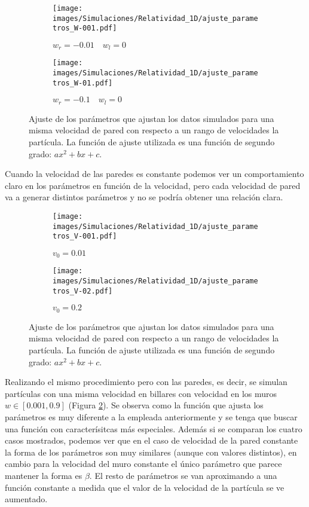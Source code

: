 \begin{figure}[H]
    \begin{subfigure}[b]{0.5\textwidth}
        \centering
        \texttt{[image: images/Simulaciones/Relatividad\_1D/ajuste\_parametros\_W-001.pdf]}
        \caption{$w_r = -0.01 \quad w_l = 0$}
    \end{subfigure}
    \hfill
    \begin{subfigure}[b]{0.5\textwidth}
        \centering
        \texttt{[image: images/Simulaciones/Relatividad\_1D/ajuste\_parametros\_W-01.pdf]}
        \caption{$w_r = -0.1 \quad w_l = 0$}
    \end{subfigure}
    \caption{Ajuste de los parámetros que ajustan los datos simulados para una misma velocidad de pared con respecto a un rango de velocidades la partícula. La función de ajuste utilizada es una función de segundo grado: \( ax^2 + bx + c \).}
    \label{fig:ajuste_parametros_1D_relativity}
\end{figure}

Cuando la velocidad de las paredes es constante podemos ver un comportamiento claro en los parámetros en función de la velocidad, pero cada velocidad de pared va a generar distintos parámetros y no se podría obtener una relación clara.

\vspace{3mm}

\begin{figure}[h]
    \begin{subfigure}[b]{0.5\textwidth}
        \centering
        \texttt{[image: images/Simulaciones/Relatividad\_1D/ajuste\_parametros\_V-001.pdf]}
        \caption{$v_0 = 0.01$}
    \end{subfigure}
    \hfill
    \begin{subfigure}[b]{0.5\textwidth}
        \centering
        \texttt{[image: images/Simulaciones/Relatividad\_1D/ajuste\_parametros\_V-02.pdf]}
        \caption{$v_0 = 0.2$}
    \end{subfigure}
    \caption{Ajuste de los parámetros que ajustan los datos simulados para una misma velocidad de pared con respecto a un rango de velocidades la partícula. La función de ajuste utilizada es una función de segundo grado: \( ax^2 + bx + c \).}
    \label{fig:ajuste_parametros_1D_relativity_Vcte}
\end{figure}

Realizando el mismo procedimiento pero con las paredes, es decir, se simulan partículas con una misma velocidad en billares con velocidad en los muros \( w \in [0.001, 0.9] \) (Figura \ref{fig:ajuste_parametros_1D_relativity_Vcte}). Se observa como la función que ajusta los parámetros es muy diferente a la empleada anteriormente y se tenga que buscar una función con caracterísitcas más especiales. Además si se comparan los cuatro casos mostrados, podemos ver que en el caso de velocidad de la pared constante la forma de los parámetros son muy similares (aunque con valores distintos), en cambio para la velocidad del muro constante el único parámetro que parece mantener la forma es \( \beta \). El resto de parámetros se van aproximando a una función constante a medida que el valor de la velocidad de la partícula se ve aumentado.

